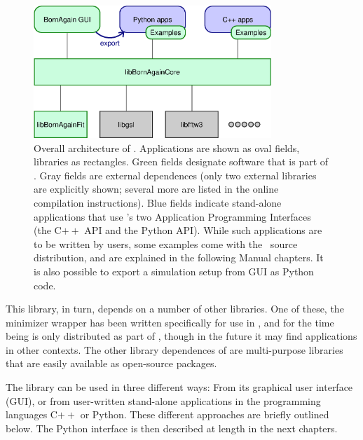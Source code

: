 \begin{figure}[tbh]
\begin{center}
\includegraphics[width=0.8\textwidth]{fig/drawing/architecture1.ps}
\end{center}
\caption{Overall architecture of \BornAgain.
%
Applications are shown as oval fields, libraries as rectangles.
Green fields designate software that is part of \BornAgain.
Gray fields are external dependences
(only two external libraries are explicitly shown;
several more are listed in the online compilation instructions).
Blue fields indicate stand-alone applications that use \BornAgain's
two Application Programming Interfaces (the C$++$ API and the Python API).
While such applications are to be written by users,
some examples come with the \BornAgain\ source distribution,
and are explained in the following Manual chapters.
It is also possible to export a simulation setup from GUI as Python code.}
\label{Farch1}
\end{figure}

This library, in turn, depends on a number of other libraries.
One of these, the minimizer wrapper 
has been written specifically for use in \BornAgain,
and for the time being is only distributed as part of \BornAgain,
though in the future it may find applications in other contexts.
The other library dependences of 
are multi-purpose libraries that are easily available as open-source packages.

The library  can be used in three different ways:
From its graphical user interface (GUI), or
from user-written stand-alone applications in the programming languages C$++$ or Python.
These different approaches are briefly outlined below.
The Python interface is then described at length in the next chapters.


